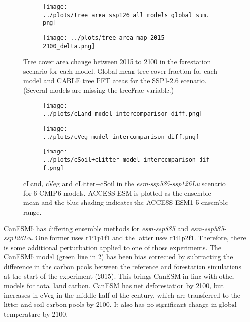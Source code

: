 \documentclass[]{article}
\begin{document}
\begin{figure}[H]
    \centering
    \begin{subfigure}[b]{0.9\linewidth}
        \texttt{[image: ../plots/tree\_area\_ssp126\_all\_models\_global\_sum.png]}
    \end{subfigure}
    \begin{subfigure}[b]{0.9\linewidth}
        \texttt{[image: ../plots/tree\_area\_map\_2015-2100\_delta.png]}
    \end{subfigure}
    \caption{Tree cover area change between 2015 to 2100 in the forestation scenario for each model. Global mean tree cover fraction for each model and CABLE tree PFT areas for the SSP1-2.6 scenario. (Several models are missing the treeFrac variable.)}
    \label{fig:land_use_map}
\end{figure}

\begin{figure}[H]
    \centering
    \begin{subfigure}[b]{0.45\linewidth}
        \texttt{[image: ../plots/cLand\_model\_intercomparison\_diff.png]}
    \end{subfigure}
    \begin{subfigure}[b]{0.45\linewidth}
        \texttt{[image: ../plots/cVeg\_model\_intercomparison\_diff.png]}
    \end{subfigure}
    \begin{subfigure}[b]{0.45\linewidth}
        \texttt{[image: ../plots/cSoil+cLitter\_model\_intercomparison\_diff.png]}
    \end{subfigure}
    \caption{cLand, cVeg and cLitter+cSoil in the \textit{esm-ssp585-ssp126Lu} scenario for 6 CMIP6 models. ACCESS-ESM is plotted as the ensemble mean and the blue shading indicates the ACCESS-ESM1-5 ensemble range.}
    \label{fig:models_cpools}
\end{figure}

CanESM5 has differing ensemble methods for \textit{esm-ssp585} and \textit{esm-ssp585-ssp126Lu}.
One former uses r1i1p1f1 and the latter uses r1i1p2f1.
Therefore, there is some additional perturbation applied to one of those experiments.
The CanESM5 model (green line in \ref{fig:models_cpools}) has been bias corrected by subtracting the difference in the carbon pools between the reference and forestation simulations at the start of the experiment (2015).
This brings CanESM in line with other models for total land carbon.
CanESM has net deforestation by 2100, but increases in cVeg in the middle half of the century, which are transferred to the litter and soil carbon pools by 2100.
It also has no significant change in global temperature by 2100.
\end{document}
